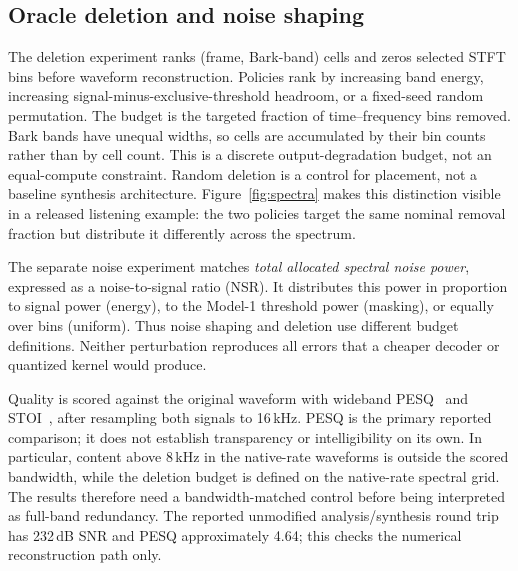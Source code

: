 \documentclass[11pt,a4paper]{article}
\begin{document}
\subsection{Oracle deletion and noise shaping}
\label{sec:harness}
The deletion experiment ranks (frame, Bark-band) cells and zeros selected STFT bins before waveform reconstruction. Policies rank by increasing band energy, increasing signal-minus-exclusive-threshold headroom, or a fixed-seed random permutation. The budget is the targeted fraction of time--frequency bins removed. Bark bands have unequal widths, so cells are accumulated by their bin counts rather than by cell count. This is a discrete output-degradation budget, not an equal-compute constraint. Random deletion is a control for placement, not a baseline synthesis architecture. Figure~\ref{fig:spectra} makes this distinction visible in a released listening example: the two policies target the same nominal removal fraction but distribute it differently across the spectrum.

The separate noise experiment matches \emph{total allocated spectral noise power}, expressed as a noise-to-signal ratio (NSR). It distributes this power in proportion to signal power (energy), to the Model-1 threshold power (masking), or equally over bins (uniform). Thus noise shaping and deletion use different budget definitions. Neither perturbation reproduces all errors that a cheaper decoder or quantized kernel would produce.

Quality is scored against the original waveform with wideband PESQ~\cite{itu_p862,rix2001pesq} and STOI~\cite{taal2011stoi}, after resampling both signals to 16\,kHz. PESQ is the primary reported comparison; it does not establish transparency or intelligibility on its own. In particular, content above 8\,kHz in the native-rate waveforms is outside the scored bandwidth, while the deletion budget is defined on the native-rate spectral grid. The results therefore need a bandwidth-matched control before being interpreted as full-band redundancy. The reported unmodified analysis/synthesis round trip has 232\,dB SNR and PESQ approximately 4.64; this checks the numerical reconstruction path only.
\end{document}

